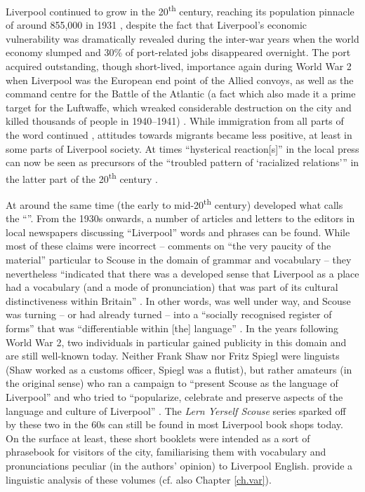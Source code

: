 Liverpool continued to grow in the 20\textsuperscript{th} century, reaching its population pinnacle of around 855,000 in 1931 \citep[cf.][171]{pooley2006}, despite the fact that Liverpool's economic vulnerability was dramatically revealed during the inter-war years when the world economy slumped and 30\% of port-related jobs disappeared overnight.
The port acquired outstanding, though short-lived, importance again during World War 2 when Liverpool was the European end point of the Allied convoys, as well as the command centre for the Battle of the Atlantic (a fact which also made it a prime target for the Luftwaffe, which wreaked considerable destruction on the city and killed thousands of people in 1940--1941) \citep[cf.][393 and 405]{murden2006}.
While immigration from all parts of the word continued \citep[cf.][119]{honeybone2007}, attitudes towards migrants became less positive, at least in some parts of Liverpool society.
At times ``hysterical reaction[s]'' in the local press can now be seen as precursors of the ``troubled pattern of `racialized relations'{}'' in the latter part of the 20\textsuperscript{th} century \citep[cf.][23]{belchem2006a}.

At around the same time (the early to mid-20\textsuperscript{th} century) developed what \citet[40]{crowley2012} calls the ``''.
From the 1930s onwards, a number of articles and letters to the editors in local newspapers discussing ``Liverpool'' words and phrases can be found.
While most of these claims were incorrect -- \citet[48]{knowles1973} comments on ``the very paucity of the material'' particular to Scouse in the domain of grammar and vocabulary -- they nevertheless ``indicated that there was a developed sense that Liverpool as a place had a vocabulary (and a mode of pronunciation) that was part of its cultural distinctiveness within Britain'' \parencite[42]{crowley2012}.
In other words, \emph{} was well under way, and Scouse was turning -- or had already turned -- into a ``socially recognised register of forms'' that was ``differentiable within [the] language'' \parencite[231]{agha2003}.
In the years following World War 2, two individuals in particular gained publicity in this domain and are still well-known today.
Neither Frank Shaw nor Fritz Spiegl were linguists (Shaw worked as a customs officer, Spiegl was a flutist), but rather amateurs (in the original sense) who ran a campaign to ``present Scouse as the language of Liverpool'' and who tried to ``popularize, celebrate and preserve aspects of the language and culture of Liverpool'' \citep[64--65]{crowley2012}.
The \emph{Lern Yerself Scouse} series sparked off by these two in the 60s can still be found in most Liverpool book shops today.
On the surface at least, these short booklets were intended as a sort of phrasebook for visitors of the city, familiarising them with vocabulary and pronunciations peculiar (in the authors' opinion) to Liverpool English. \citet{honeybonewatson2013} provide a linguistic analysis of these volumes (cf. also Chapter \ref{ch.var}).

